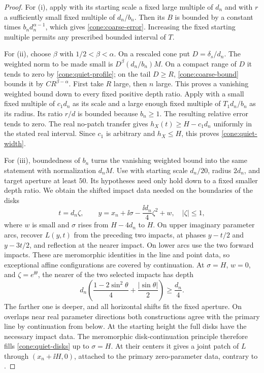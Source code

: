 \begin{proof}
For \textup{(i)}, apply  with its starting scale a fixed
large multiple of \(d_n\) and with \(r\) a sufficiently small fixed
multiple of \(d_n/b_n\). Then its \(B\) is bounded by a constant times
\(b_nd_n^{\alpha-1}\), which gives \eqref{cone:coarse-error}. Increasing
the fixed starting multiple permits any prescribed bounded interval
of \(T\).

For \textup{(ii)}, choose \(\beta\) with \(1/2<\beta<\alpha\).
On a rescaled cone put \(D=\delta_s/d_n\). The weighted norm to be made
small is
\(D^\beta(d_n/b_n)M\). On a compact range of \(D\) it tends to zero
by \eqref{cone:quiet-profile}; on the tail \(D\ge R\),
\eqref{cone:coarse-bound} bounds it by \(CR^{\beta-\alpha}\).
First take \(R\) large, then \(n\) large. This proves a vanishing
weighted bound down to every fixed positive depth ratio. Apply
 with a small fixed multiple of \(c_1d_n\) as its scale
and a large enough fixed multiple of \(T_1d_n/b_n\) as its radius.
Its ratio \(r/d\) is bounded because \(b_n\ge1\). The resulting
relative error tends to zero. The real no-patch transfer gives
\(h_X(t)\ge H-c_1d_n\) uniformly in the stated real interval.
Since \(c_1\) is arbitrary and \(h_X\le H\), this proves
\eqref{cone:quiet-width}.

For \textup{(iii)}, boundedness of \(b_n\) turns the vanishing weighted
bound into the same statement with normalization \(d_nM\). Use
 with starting scale \(d_n/20\), radius \(2d_n\), and
target aperture at least \(50\). Its hypotheses need only hold down
to a fixed smaller depth ratio. We obtain the shifted impact data
needed on the boundaries of the disks
\begin{equation}\label{cone:quiet-disks}
 t=d_n\zeta,\qquad
 y=x_n+\ii\sigma-\frac{\ii d_n}{4}\zeta^2+w,
 \quad |\zeta|\le1,
\end{equation}
where \(w\) is small and \(\sigma\) rises from \(H-4d_n\) to \(H\).
On upper imaginary parameter arcs, recover \(L(y,t)\) from the
preceding two impacts, at phases \(y-t/2\) and \(y-3t/2\), and
reflection at the nearer impact. On lower arcs use the two forward
impacts. These are meromorphic identities in the line and point data,
so exceptional affine configurations are covered by continuation.
At \(\sigma=H\), \(w=0\), and \(\zeta=e^{\ii\theta}\), the nearer
of the two selected impacts has depth
\[
 d_n\left(\frac{1-2\sin^2\theta}{4}
                 +\frac{|\sin\theta|}{2}\right)\ge\frac{d_n}{4}.
\]
The farther one is deeper, and all horizontal shifts fit the fixed
aperture. On overlaps near real parameter directions both
constructions agree with the primary line by continuation from below.
At the starting height the full disks have the necessary impact data.
The meromorphic disk-continuation principle therefore fills
\eqref{cone:quiet-disks} up to \(\sigma=H\). At their centers it gives
a joint patch of \(L\) through \((x_n+\ii H,0)\), attached to the
primary zero-parameter data, contrary to .
\end{proof}

